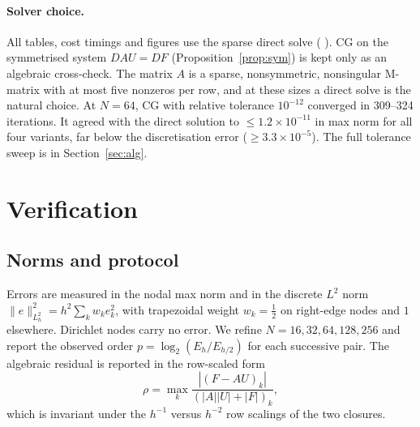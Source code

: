\documentclass[11pt,a4paper]{article}
\theoremstyle{palplain}
\theoremstyle{paldef}
\theoremstyle{palremark}
\begin{document}
\paragraph{Solver choice.} All tables, cost timings
and figures use the sparse direct solve
( \cite{scipy}). CG on the symmetrised system $DAU=DF$
(Proposition~\ref{prop:sym}) is kept only as an algebraic cross-check. The matrix $A$ is a
sparse, nonsymmetric, nonsingular M-matrix with at most five nonzeros per row, and at these
sizes a direct solve is the natural choice. At $N=64$, CG with relative tolerance $10^{-12}$
converged in 309--324 iterations. It agreed with the direct solution to $\le1.2\times10^{-11}$
in max norm for all four variants, far below the discretisation error ($\ge3.3\times10^{-5}$).
The full tolerance sweep is in Section~\ref{sec:alg}.

\section{Verification}\label{sec:verif}
\subsection{Norms and protocol}
Errors are measured in the nodal max norm and in the discrete $L^2$ norm
$\|e\|_{L^2_h}^2=h^2\sum_{k}w_ke_k^2$, with trapezoidal weight $w_k=\tfrac12$ on right-edge nodes
and $1$ elsewhere. Dirichlet nodes carry no error. We refine $N=16,32,64,128,256$ and report the
observed order $p=\log_2(E_{h}/E_{h/2})$ for each successive pair. The algebraic residual is
reported in the row-scaled form
\begin{equation}\label{eq:sres}
\rho=\max_k\frac{|(F-AU)_k|}{(|A||U|+|F|)_k},
\end{equation}
which is invariant under the $h^{-1}$ versus $h^{-2}$ row scalings of the two closures.
\end{document}
